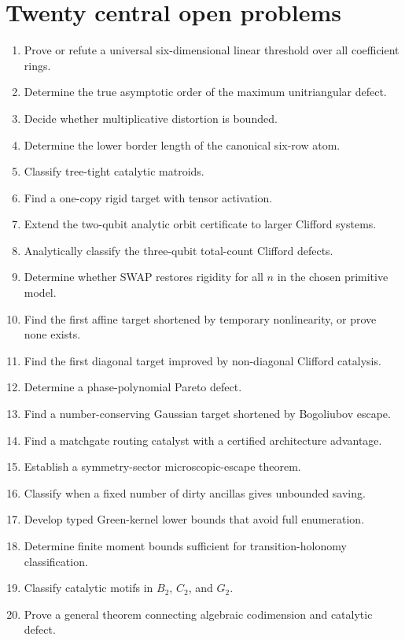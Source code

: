 \section{Twenty central open problems}
\begin{enumerate}
\item Prove or refute a universal six-dimensional linear threshold over all coefficient rings.
\item Determine the true asymptotic order of the maximum unitriangular defect.
\item Decide whether multiplicative distortion is bounded.
\item Determine the lower border length of the canonical six-row atom.
\item Classify tree-tight catalytic matroids.
\item Find a one-copy rigid target with tensor activation.
\item Extend the two-qubit analytic orbit certificate to larger Clifford systems.
\item Analytically classify the three-qubit total-count Clifford defects.
\item Determine whether SWAP restores rigidity for all $n$ in the chosen primitive model.
\item Find the first affine target shortened by temporary nonlinearity, or prove none exists.
\item Find the first diagonal target improved by non-diagonal Clifford catalysis.
\item Determine a phase-polynomial Pareto defect.
\item Find a number-conserving Gaussian target shortened by Bogoliubov escape.
\item Find a matchgate routing catalyst with a certified architecture advantage.
\item Establish a symmetry-sector microscopic-escape theorem.
\item Classify when a fixed number of dirty ancillas gives unbounded saving.
\item Develop typed Green-kernel lower bounds that avoid full enumeration.
\item Determine finite moment bounds sufficient for transition-holonomy classification.
\item Classify catalytic motifs in $B_2$, $C_2$, and $G_2$.
\item Prove a general theorem connecting algebraic codimension and catalytic defect.
\end{enumerate}


